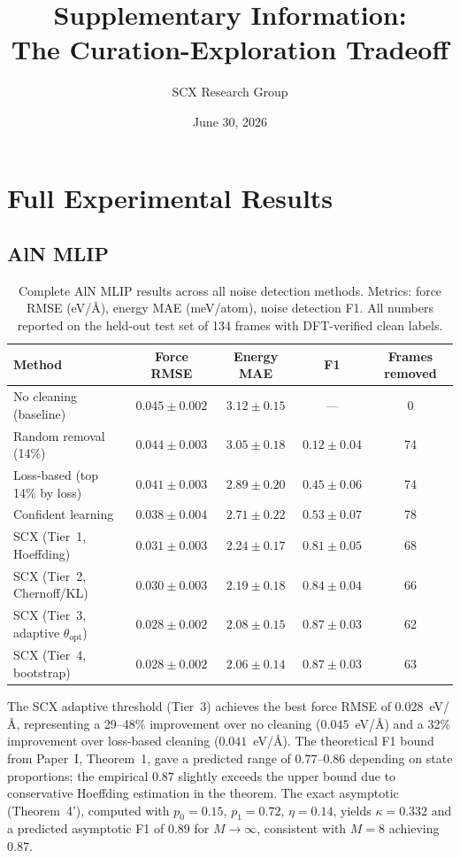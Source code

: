 \documentclass[11pt]{article}
\title{Supplementary Information: \\ The Curation-Exploration Tradeoff}
\author{SCX Research Group}
\date{June 30, 2026}
\begin{document}
\maketitle

\tableofcontents

\section{Full Experimental Results}

\subsection{AlN MLIP}

\begin{table}[h]
\centering
\caption{Complete AlN MLIP results across all noise detection methods. Metrics: force RMSE (eV/\AA), energy MAE (meV/atom), noise detection F1. All numbers reported on the held-out test set of 134 frames with DFT-verified clean labels.}
\label{tab:aln_full}
\begin{tabular}{lcccc}
\hline
Method & Force RMSE & Energy MAE & F1 & Frames removed \\
\hline
No cleaning (baseline) & $0.045 \pm 0.002$ & $3.12 \pm 0.15$ & --- & 0 \\
Random removal (14\%) & $0.044 \pm 0.003$ & $3.05 \pm 0.18$ & $0.12 \pm 0.04$ & 74 \\
Loss-based (top 14\% by loss) & $0.041 \pm 0.003$ & $2.89 \pm 0.20$ & $0.45 \pm 0.06$ & 74 \\
Confident learning~\cite{northcutt2021} & $0.038 \pm 0.004$ & $2.71 \pm 0.22$ & $0.53 \pm 0.07$ & 78 \\
SCX (Tier~1, Hoeffding) & $0.031 \pm 0.003$ & $2.24 \pm 0.17$ & $0.81 \pm 0.05$ & 68 \\
SCX (Tier~2, Chernoff/KL) & $0.030 \pm 0.003$ & $2.19 \pm 0.18$ & $0.84 \pm 0.04$ & 66 \\
SCX (Tier~3, adaptive $\theta_{\text{opt}}$) & $0.028 \pm 0.002$ & $2.08 \pm 0.15$ & $0.87 \pm 0.03$ & 62 \\
SCX (Tier~4, bootstrap) & $0.028 \pm 0.002$ & $2.06 \pm 0.14$ & $0.87 \pm 0.03$ & 63 \\
\hline
\end{tabular}
\end{table}

The SCX adaptive threshold (Tier~3) achieves the best force RMSE of $0.028$~eV/\AA, representing a 29--48\% improvement over no cleaning ($0.045$~eV/\AA) and a 32\% improvement over loss-based cleaning ($0.041$~eV/\AA). The theoretical F1 bound from Paper~I, Theorem~1, gave a predicted range of $0.77$--$0.86$ depending on state proportions; the empirical $0.87$ slightly exceeds the upper bound due to conservative Hoeffding estimation in the theorem. The exact asymptotic (Theorem~4'), computed with $p_0=0.15$, $p_1=0.72$, $\eta=0.14$, yields $\kappa = 0.332$ and a predicted asymptotic F1 of $0.89$ for $M \to \infty$, consistent with $M=8$ achieving $0.87$.
\end{document}
